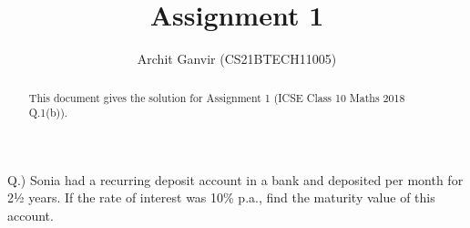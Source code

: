 \documentclass[journal,12pt,twocolumn]{IEEEtran}
\begin{document}
\newcommand{\solution}{\noindent \textbf{Solution: }}

\lstset{
frame=single, 
breaklines=true,
columns=fullflexible
}

\title{Assignment 1}
\author{Archit Ganvir (CS21BTECH11005)}

\maketitle

\begin{abstract}
    This document gives the solution for Assignment 1 (ICSE Class 10 Maths 2018 Q.1(b)).
\end{abstract}

Q.) Sonia had a recurring deposit account in a bank and deposited  per month for 2½ years. If the rate of interest was 10\% p.a., find the maturity value of this account.\\
\end{document}
